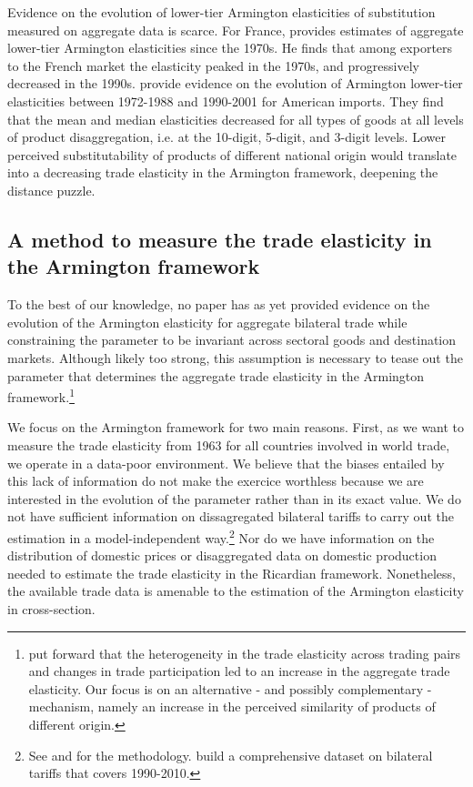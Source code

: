 \documentclass[12pt,twoside,a4paper,notitlepage]{article}
\begin{document}
Evidence on the evolution of lower-tier Armington elasticities of substitution measured on aggregate data is scarce.
For France, \cite{Welsch2006} provides estimates of aggregate lower-tier Armington elasticities since the 1970s.
He finds that among exporters to the French market the elasticity peaked in the 1970s, and progressively decreased in the 1990s.
\cite{Broda2006} provide evidence on the evolution of Armington lower-tier elasticities between 1972-1988 and 1990-2001 for American imports.
They find that the mean and median elasticities decreased for all types of goods at all levels of product disaggregation, i.e.
at the 10-digit, 5-digit, and 3-digit levels.
Lower perceived substitutability of products of different national origin would translate into a decreasing trade elasticity in the Armington framework,  deepening the distance puzzle. 

\subsection{ \label{ref-001}A method to measure the trade elasticity in the Armington framework\label{mark-1.3.}}

To the best of our knowledge, no paper has as yet provided evidence on the evolution of the Armington elasticity for aggregate bilateral trade while constraining the parameter to be invariant across sectoral goods and destination markets. Although likely too strong, this assumption is necessary to tease out the parameter that determines the aggregate trade elasticity in the Armington framework.\footnote{\cite{Head2013} put forward that the heterogeneity in the trade elasticity across trading pairs and changes in trade participation led to an increase in the aggregate trade elasticity. Our focus is on an alternative - and possibly complementary - mechanism, namely an increase in the perceived similarity of products of different origin.} 

We focus on the Armington framework for two main reasons. 
First, as we want to measure the trade elasticity from 1963 for all countries involved in world trade, we operate in a data-poor environment. 
We believe that the biases entailed by this lack of information do not make the exercice worthless because we are interested in the evolution of the parameter rather than in its exact value.
We do not have sufficient information on dissagregated bilateral tariffs to carry out the estimation in a model-independent way.\footnote{See \cite{Head2001} and \cite{Caliendo2015} for the methodology. \cite{Caliendo2015a} build a comprehensive dataset on bilateral tariffs that covers 1990-2010.} 
Nor do we have information on the distribution of domestic prices or disaggregated data on domestic production needed to estimate the trade elasticity in the Ricardian framework. Nonetheless, the available trade data is amenable to the estimation of the Armington elasticity in cross-section.
 
\end{document}
